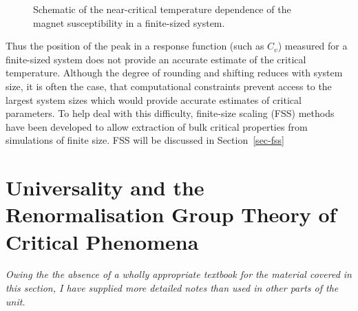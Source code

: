 \documentclass[
  letterpaper,
  enabledeprecatedfontcommands]{report}
\begin{document}
\begin{figure}


\caption{\label{fig-shift}Schematic of the near-critical temperature
dependence of the magnet susceptibility in a finite-sized system.}

\end{figure}%

Thus the position of the peak in a response function (such as \(C_v\))
measured for a finite-sized system does not provide an accurate estimate
of the critical temperature. Although the degree of rounding and
shifting reduces with system size, it is often the case, that
computational constraints prevent access to the largest system sizes
which would provide accurate estimates of critical parameters. To help
deal with this difficulty, finite-size scaling (FSS) methods have been
developed to allow extraction of bulk critical properties from
simulations of finite size. FSS will be discussed in
Section~\ref{sec-fss}

\chapter{Universality and the Renormalisation Group Theory of Critical
Phenomena}\label{universality-and-the-renormalisation-group-theory-of-critical-phenomena}

\emph{Owing the the absence of a wholly appropriate textbook for the
material covered in this section, I have supplied more detailed notes
than used in other parts of the unit.}
\end{document}
